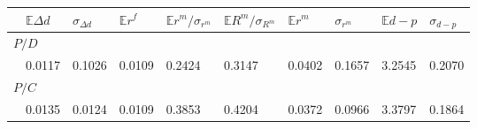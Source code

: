 \begin{tabular}{@{}llllllllll@{}}
\toprule 
 & $\mathbb{E}\Delta d$ & $\sigma_{\Delta d}$ & $\mathbb{E}r^f$ & $\mathbb{E}r^m/\sigma _{r^m}$ & $\mathbb{E}R^m/\sigma _{R^m}$ & $\mathbb{E}r^m$ & $\sigma_{r^m}$ & $\mathbb{E}d-p$ & $\sigma_{d-p}$  \\ 
\midrule 
\multicolumn{10}{l}{$P/D$}\\
 & 0.0117 & 0.1026 & 0.0109 & 0.2424 & 0.3147 & 0.0402 & 0.1657 & 3.2545 & 0.2070 \\ 
\multicolumn{10}{l}{$P/C$}\\
& 0.0135 & 0.0124 & 0.0109 & 0.3853 & 0.4204 & 0.0372 & 0.0966 & 3.3797 & 0.1864 \\ 
\bottomrule 
\end{tabular}